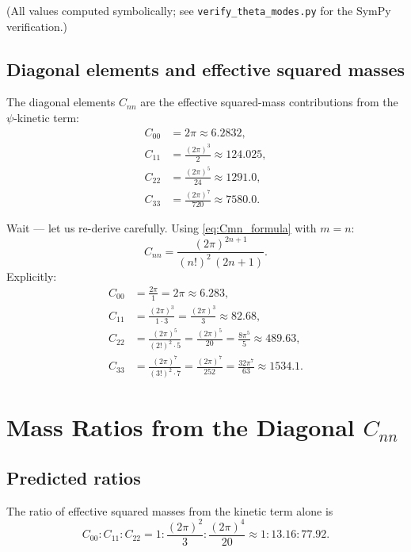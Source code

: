 \documentclass[12pt,a4paper]{article}
\theoremstyle{remark}
\begin{document}
(All values computed symbolically; see
\texttt{verify\_theta\_modes.py} for the SymPy verification.)

\subsection{Diagonal elements and effective squared masses}

The diagonal elements $C_{nn}$ are the effective squared-mass
contributions from the $\psi$-kinetic term:
\begin{align}
  C_{00} &= 2\pi \approx 6.2832, \\
  C_{11} &= \frac{(2\pi)^3}{2} \approx 124.025, \\
  C_{22} &= \frac{(2\pi)^5}{24} \approx 1291.0, \\
  C_{33} &= \frac{(2\pi)^7}{720} \approx 7580.0.
\end{align}

Wait — let us re-derive carefully.  Using \eqref{eq:Cmn_formula} with
$m=n$:
\begin{equation}
  C_{nn}
  = \frac{(2\pi)^{2n+1}}{(n!)^2\,(2n+1)}.
\end{equation}
Explicitly:
\begin{align}
  C_{00} &= \frac{2\pi}{1} = 2\pi \approx 6.283, \\
  C_{11} &= \frac{(2\pi)^3}{1\cdot 3} = \frac{(2\pi)^3}{3} \approx 82.68, \\
  C_{22} &= \frac{(2\pi)^5}{(2!)^2\cdot 5} = \frac{(2\pi)^5}{20} = \frac{8\pi^5}{5} \approx 489.63, \\
  C_{33} &= \frac{(2\pi)^7}{(3!)^2\cdot 7} = \frac{(2\pi)^7}{252} = \frac{32\pi^7}{63} \approx 1534.1.
\end{align}

\section{Mass Ratios from the Diagonal $C_{nn}$}
\label{sec:ratios}

\subsection{Predicted ratios}

The ratio of effective squared masses from the kinetic term alone is
\begin{equation}
  C_{00} : C_{11} : C_{22}
  = 1 :
    \frac{(2\pi)^2}{3} :
    \frac{(2\pi)^4}{20}
  \approx
  1 : 13.16 : 77.92.
\end{equation}
\end{document}
